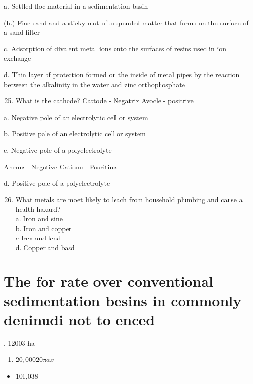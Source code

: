 \documentclass[10pt]{article}
\begin{document}
a. Settled floc material in a sedimentation basin

(b.) Fine sand and a sticky mat of suspended matter that forms on the surface of a sand filter

c. Adsorption of divalent metal ions onto the surfaces of resins used in ion exchange

d. Thin layer of protection formed on the inside of metal pipes by the reaction between the alkalinity in the water and zinc orthophosphate

\begin{enumerate}
  \setcounter{enumi}{24}
  \item What is the cathode? Cattode - Negatrix Avocle - positrive
\end{enumerate}

a. Negative pole of an electrolytic cell or system

b. Positive pale of an electrolytic cell or system

c. Negative pole of a polyelectrolyte

Anrme - Negative Catione - Posritine.

d. Positive pole of a polyelectrolyte

\begin{enumerate}
  \setcounter{enumi}{25}
  \item What metals are moet likely to leach from household plumbing and cause a health haxard?\\
a. Iron and sine\\
b. Iron and copper\\
c Irex and lend\\
d. Copper and basd
\end{enumerate}

\section{The for rate over conventional sedimentation besins in commonly deninudi not to enced}
. 12003 ha

\begin{enumerate}
  \item $20,00020 \pi a x$
\end{enumerate}

\begin{itemize}
  \item 101,038
\end{itemize}
\end{document}
